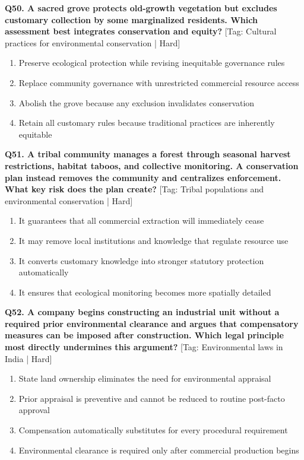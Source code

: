 \noindent\textbf{Q50. A sacred grove protects old-growth vegetation but excludes customary collection by some marginalized residents. Which assessment best integrates conservation and equity?} \hfill [Tag: Cultural practices for environmental conservation | Hard]
\begin{enumerate}[label=(\alph*),topsep=2pt,itemsep=1pt,partopsep=0pt,parsep=0pt]
    \item {Preserve ecological protection while revising inequitable governance rules}
    \item {Replace community governance with unrestricted commercial resource access}
    \item {Abolish the grove because any exclusion invalidates conservation}
    \item {Retain all customary rules because traditional practices are inherently equitable}
\end{enumerate}
\vspace{2mm}

\noindent\textbf{Q51. A tribal community manages a forest through seasonal harvest restrictions, habitat taboos, and collective monitoring. A conservation plan instead removes the community and centralizes enforcement. What key risk does the plan create?} \hfill [Tag: Tribal populations and environmental conservation | Hard]
\begin{enumerate}[label=(\alph*),topsep=2pt,itemsep=1pt,partopsep=0pt,parsep=0pt]
    \item {It guarantees that all commercial extraction will immediately cease}
    \item {It may remove local institutions and knowledge that regulate resource use}
    \item {It converts customary knowledge into stronger statutory protection automatically}
    \item {It ensures that ecological monitoring becomes more spatially detailed}
\end{enumerate}
\vspace{2mm}

\noindent\textbf{Q52. A company begins constructing an industrial unit without a required prior environmental clearance and argues that compensatory measures can be imposed after construction. Which legal principle most directly undermines this argument?} \hfill [Tag: Environmental laws in India | Hard]
\begin{enumerate}[label=(\alph*),topsep=2pt,itemsep=1pt,partopsep=0pt,parsep=0pt]
    \item {State land ownership eliminates the need for environmental appraisal}
    \item {Prior appraisal is preventive and cannot be reduced to routine post-facto approval}
    \item {Compensation automatically substitutes for every procedural requirement}
    \item {Environmental clearance is required only after commercial production begins}
\end{enumerate}
\vspace{2mm}

